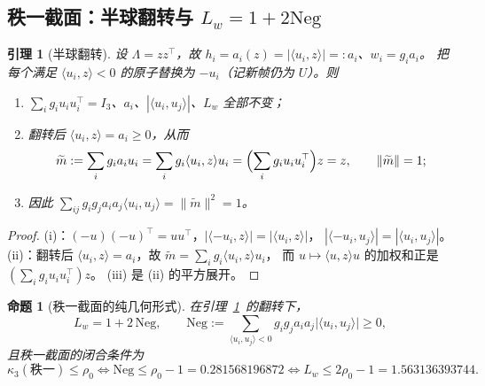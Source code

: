 \documentclass[UTF8,11pt]{ctexart}
\newtheorem{proposition}[theorem]{命题}
\newtheorem{lemma}[theorem]{引理}
\theoremstyle{definition}
\newcommand{\Lam}{\Lambda}
\begin{document}
\subsection{秩一截面：半球翻转与 $L_w=1+2\mathrm{Neg}$}\label{sec:r26:rank1}

\begin{lemma}[半球翻转]\label{lem:r26hemi}
设 $\Lam=zz^\top$，故 $h_i=a_i(z)=|\langle u_i,z\rangle|=:a_i$、$w_i=g_ia_i$。
把每个满足 $\langle u_i,z\rangle<0$ 的原子替换为 $-u_i$（记新帧仍为 $U$）。则
\begin{enumerate}[label=(\roman*),leftmargin=2.2em,itemsep=1pt]
\item $\sum_ig_iu_iu_i^\top=I_3$、$a_i$、$|\langle u_i,u_j\rangle|$、$L_w$ 全部不变；
\item 翻转后 $\langle u_i,z\rangle=a_i\ge0$，从而
\begin{equation}\label{eq:r26hemi}
\widetilde m:=\sum_ig_ia_iu_i=\sum_ig_i\langle u_i,z\rangle u_i
=\Bigl(\sum_ig_iu_iu_i^\top\Bigr)z=z,\qquad \|\widetilde m\|=1 ;
\end{equation}
\item 因此 $\sum_{ij}g_ig_ja_ia_j\langle u_i,u_j\rangle=\|\widetilde m\|^2=1$。
\end{enumerate}
\end{lemma}

\begin{proof}
(i)：$(-u)(-u)^\top=uu^\top$，$|\langle -u_i,z\rangle|=|\langle u_i,z\rangle|$，
$|\langle -u_i,u_j\rangle|=|\langle u_i,u_j\rangle|$。
(ii)：翻转后 $\langle u_i,z\rangle=a_i$，故 $\widetilde m=\sum_ig_i\langle u_i,z\rangle u_i$，
而 $u\mapsto\langle u,z\rangle u$ 的加权和正是 $(\sum_ig_iu_iu_i^\top)z$。
(iii) 是 (ii) 的平方展开。
\end{proof}

\begin{proposition}[秩一截面的纯几何形式]\label{prop:r26rank1}
在引理~\ref{lem:r26hemi}~的翻转下，
\begin{equation}\label{eq:r26r1}
L_w=1+2\,\mathrm{Neg},\qquad
\mathrm{Neg}:=\sum_{\langle u_i,u_j\rangle<0}g_ig_ja_ia_j\bigl|\langle u_i,u_j\rangle\bigr|\ge0 ,
\end{equation}
且秩一截面的闭合条件为
\begin{equation}\label{eq:r26r2}
\kappa_3(\text{秩一})\le\rho_0\iff\mathrm{Neg}\le\rho_0-1=0.281568196872
\iff L_w\le2\rho_0-1=1.563136393744 .
\end{equation}
\end{proposition}
\end{document}
